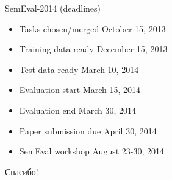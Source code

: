 \documentclass{beamer}
\begin{document}
\begin{frame}{SemEval-2014 (deadlines)}
    \begin{itemize}
        \item Tasks chosen/merged October 15, 2013
		\item Training data ready December 15, 2013
		\item Test data ready March 10, 2014
		\item Evaluation start March 15, 2014
		\item Evaluation end March 30, 2014
		\item Paper submission due April 30, 2014
		\item SemEval workshop August 23-30, 2014
    \end{itemize}
\end{frame}


\begin{frame}{}
    \thispagestyle{empty}
    \begin{center}
        {\large Спасибо!}
    \end{center}
\end{frame}


\end{document}
